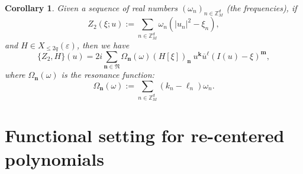 \documentclass[JEP,XML,SOM,Unicode,published]{cedram}
\theoremstyle{plain}
\newtheorem{corollary}[theorem]{Corollary}
\theoremstyle{definition}
\newcommand{\nb}{{\boldsymbol n}}
\newcommand{\kb}{{\boldsymbol k}}
\newcommand{\lb}{{\boldsymbol \ell}}
\newcommand{\mb}{{\boldsymbol m}}
\newcommand{\Nb}{{\boldsymbol{\mathfrak{N}}}}
\newcommand{\Z}{\mathbb{Z}}
\newcommand{\1}{\mathbf{1}}
\let\epsilon\varepsilon
\begin{document}
\begin{corollary}
Given a sequence of real numbers $(\omega_{n})_{n\in\Z_{M}^{d}}$ (the frequencies), if
\[
Z_{2}(\xi;u) := \sum_{n\in\Z_{M}^{d}}\omega_{n}(|u_{n}|^{2}-\xi_{n}),
\]
and $H\in X_{\leq2q}(\epsilon)$, then we have
\[
\{Z_{2},H\}(u) = 2i\sum_{\nb\in\Nb}\Omega_{\nb}(\omega)(H[\xi])_{\nb}\ u^{\kb}\overline{u}^{\lb}(I(u)-\xi)^{\mb},
\]
where $\Omega_{\nb}(\omega)$ is the resonance function:
\begin{equation}
\label{eq:rf1}
\Omega_{\nb}(\omega) := \sum_{n\in\Z_{M}^{d}}(k_{n}-\ell_{n})\omega_{n}.
\end{equation}
\end{corollary}

\section{Functional setting for re-centered polynomials}
\label{sec:main-nf-su}
\end{document}
